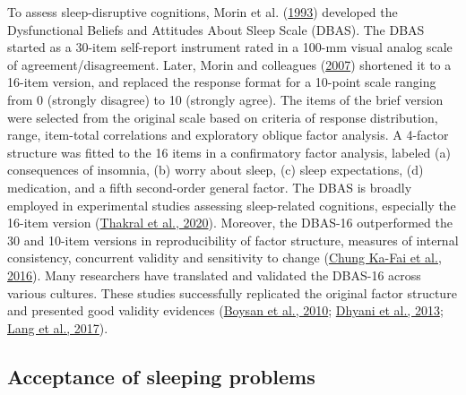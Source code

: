 \documentclass[
  ,doc,11pt, twoside,floatsintext]{apa6}
\begin{document}
To assess sleep-disruptive cognitions, Morin et al. (\protect\hyperlink{ref-morin1993insomnia}{1993}) developed the Dysfunctional Beliefs and Attitudes About Sleep Scale (DBAS). The DBAS started as a 30-item self-report instrument rated in a 100-mm visual analog scale of agreement/disagreement. Later, Morin and colleagues (\protect\hyperlink{ref-morin2007a}{2007}) shortened it to a 16-item version, and replaced the response format for a 10-point scale ranging from 0 (strongly disagree) to 10 (strongly agree). The items of the brief version were selected from the original scale based on criteria of response distribution, range, item-total correlations and exploratory oblique factor analysis. A 4-factor structure was fitted to the 16 items in a confirmatory factor analysis, labeled (a) consequences of insomnia, (b) worry about sleep, (c) sleep expectations, (d) medication, and a fifth second-order general factor. The DBAS is broadly employed in experimental studies assessing sleep-related cognitions, especially the 16-item version (\protect\hyperlink{ref-thakral2020}{Thakral et al., 2020}). Moreover, the DBAS-16 outperformed the 30 and 10-item versions in reproducibility of factor structure, measures of internal consistency, concurrent validity and sensitivity to change (\protect\hyperlink{ref-chungka-fai2016}{Chung Ka-Fai et al., 2016}). Many researchers have translated and validated the DBAS-16 across various cultures. These studies successfully replicated the original factor structure and presented good validity evidences (\protect\hyperlink{ref-boysan2010}{Boysan et al., 2010}; \protect\hyperlink{ref-dhyani2013}{Dhyani et al., 2013}; \protect\hyperlink{ref-lang2017}{Lang et al., 2017}).

\hypertarget{acceptance-of-sleeping-problems}{%
\subsection{Acceptance of sleeping problems}\label{acceptance-of-sleeping-problems}}
\end{document}
